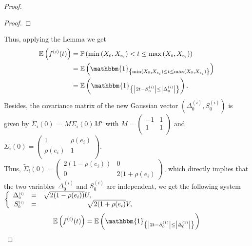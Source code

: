 \documentclass[12pt]{article}
\renewcommand{\tilde}{\widetilde}
\theoremstyle{Theorem}
\begin{document}
\begin{proof}
\begin{proof}
\end{proof}
Thus, applying the Lemma we get 
{\small
\begin{align*}
\mathbb{E}\left(f^{(i)}(t)\right) & = \mathbb{P}\left(\min\left(X_{\scriptscriptstyle 0}, X_{e_i}\right) < t \leq \max\left(X_{\scriptscriptstyle 0}, X_{e_i}\right)\right) \\
& = \mathbb{E}\left(\mathbbm{1}_{\left\{\min(X_{\scriptscriptstyle 0}, X_{e_i}) \leq t \leq \max(X_{\scriptscriptstyle 0}, X_{e_i})\right\}}\right) \\
& = \mathbb{E}\left(\mathbbm{1}_{\left\{ \left|2t - S^{\scriptscriptstyle (i)}_{\scriptscriptstyle 0}\right| \leq \left|\Delta^{\scriptscriptstyle (i)}_{\scriptscriptstyle 0}\right|\right\}}\right).
\end{align*}}Besides, the covariance matrix of the new Gaussian vector $\left(\Delta^{\scriptscriptstyle (i)}_{\scriptscriptstyle 0}, S^{\scriptscriptstyle (i)}_{\scriptscriptstyle 0}\right)$ is given by ${\tilde{\Sigma}_{i}(0)~= M\Sigma_{i}(0) M^{\star}}$ with {\small $M = \begin{pmatrix}
-1 & 1 \\
1 & 1  \\
\end{pmatrix}$} and $\Sigma_{i}(0) = \begin{pmatrix} 1 & \rho(e_i) \\
\rho(e_i) & 1  \\ 
\end{pmatrix}.$ \\
Thus, $\tilde{\Sigma}_{i}(0) = \begin{pmatrix}  2(1-\rho(e_i)) & 0 \\ 0 & 2(1+\rho(e_i)  \end{pmatrix}$, which directly  implies that the two variables~$\Delta^{\scriptscriptstyle (i)}_{\scriptscriptstyle 0}$ and $S^{\scriptscriptstyle (i)}_{\scriptscriptstyle 0}$ are independent, we get the following system 
$\left\{
 \begin{array}{rlc}
  \Delta^{\scriptscriptstyle (i)}_{\scriptscriptstyle 0} & = & \sqrt{2(1-\rho(e_i))}U, \textcolor{white}{(1-\rho(e_i))U + }\\
  S^{\scriptscriptstyle (i)}_{\scriptscriptstyle 0} & = & \textcolor{white}{(1-\rho(e_i))U + } \sqrt{2(1+\rho(e_i)}V, 
\end{array}
\right.$
{\small
\begin{align*}
\mathbb{E}\left(f^{(i)}(t)\right) & = \mathbb{E}\left(\mathbbm{1}_{\left\{ \left|2t - S^{\scriptscriptstyle (1)}_{\scriptscriptstyle 0}\right| \leq \left|\Delta^{\scriptscriptstyle (1)}_{\scriptscriptstyle 0}\right|\right\}}\right) \\

\end{align*}}
\end{proof}
\end{document}
